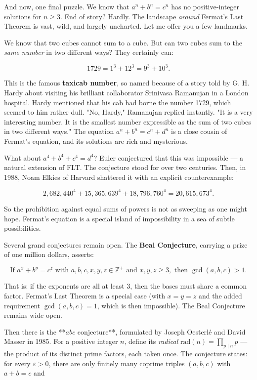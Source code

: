 \documentclass[12pt, letterpaper, openany]{book}
\theoremstyle{definition}
\theoremstyle{remark}
\begin{document}
And now, one final puzzle. We know that $a^n + b^n = c^n$ has no positive-integer solutions for $n \ge 3$. End of story? Hardly. The landscape \textit{around} Fermat's Last Theorem is vast, wild, and largely uncharted. Let me offer you a few landmarks.

We know that two cubes cannot sum to a cube. But can two cubes sum to the \textit{same number} in two different ways? They certainly can:

\[
1729 = 1^3 + 12^3 = 9^3 + 10^3.
\]

This is the famous \textbf{taxicab number}, so named because of a story told by G. H. Hardy about visiting his brilliant collaborator Srinivasa Ramanujan in a London hospital. Hardy mentioned that his cab had borne the number 1729, which seemed to him rather dull. "No, Hardy," Ramanujan replied instantly. "It is a very interesting number. It is the smallest number expressible as the sum of two cubes in two different ways." The equation $a^n + b^n = c^n + d^n$ is a close cousin of Fermat's equation, and its solutions are rich and mysterious.

What about $a^4 + b^4 + c^4 = d^4$? Euler conjectured that this was impossible --- a natural extension of FLT. The conjecture stood for over two centuries. Then, in 1988, Noam Elkies of Harvard shattered it with an explicit counterexample:

\[
2{,}682{,}440^4 + 15{,}365{,}639^4 + 18{,}796{,}760^4 = 20{,}615{,}673^4.
\]

So the prohibition against equal sums of powers is not as sweeping as one might hope. Fermat's equation is a special island of impossibility in a sea of subtle possibilities.

Several grand conjectures remain open. The \textbf{Beal Conjecture}, carrying a prize of one million dollars, asserts:

\[
\text{If } a^x + b^y = c^z \text{ with } a, b, c, x, y, z \in \mathbb{Z}^+ \text{ and } x, y, z \ge 3, \text{ then } \gcd(a, b, c) > 1.
\]

That is: if the exponents are all at least $3$, then the bases must share a common factor. Fermat's Last Theorem is a special case (with $x = y = z$ and the added requirement $\gcd(a,b,c) = 1$, which is then impossible). The Beal Conjecture remains wide open.

Then there is the **$abc$ conjecture**, formulated by Joseph Oesterl\'e and David Masser in 1985. For a positive integer $n$, define its \textit{radical} $\mathrm{rad}(n) = \prod_{p \mid n} p$ --- the product of its distinct prime factors, each taken once. The conjecture states: for every $\varepsilon > 0$, there are only finitely many coprime triples $(a, b, c)$ with $a + b = c$ and
\end{document}
